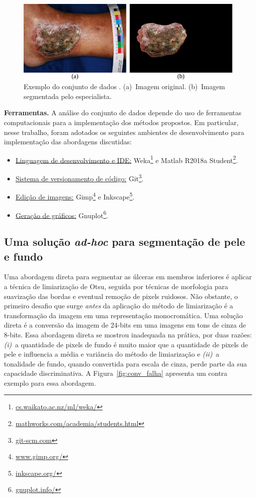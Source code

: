 \begin{figure}[!htb]
\centering
\includegraphics[scale=1]{_fig/im_sampling_vs_im_label.pdf}
\caption[Exemplo do conjunto de dados \dataset.]{Exemplo do conjunto de dados \dataset.
(a)~Imagem original.
(b)~Imagem segmentada pelo especialista.}
\label{fig:dataset_esp}
\end{figure}

\noindent
\textbf{Ferramentas.}
A análise do conjunto de dados depende do uso de ferramentas computacionais para a implementação dos métodos propostos.
Em particular, nesse trabalho, foram adotados os seguintes ambientes de desenvolvimento para implementação das abordagens discutidas:

\begin{itemize}
    \item \underline{Linguagem de desenvolvimento e IDE:} Weka\footnote{\url{cs.waikato.ac.nz/ml/weka/}} e Matlab R2018a Student\footnote{\url{mathworks.com/academia/students.html}}.
    \item \underline{Sistema de versionamento de código:} Git\footnote{\url{git-scm.com}}.
    \item \underline{Edição de imagens:} Gimp\footnote{\url{www.gimp.org/}} e Inkscape\footnote{\url{inkscape.org/}}.
    \item \underline{Geração de gráficos:} Gnuplot\footnote{\url{gnuplot.info/}}.
\end{itemize}

\subsection{Uma solução \textit{ad-hoc} para segmentação de pele e fundo}

Uma abordagem direta para segmentar as úlceras em membros inferiores é aplicar a técnica de limiarização de Otsu, seguida por técnicas de morfologia para suavização das bordas e eventual remoção de pixels ruidosos.
Não obstante, o primeiro desafio que surge \textit{antes} da aplicação do método de limiarização é a transformação da imagem em uma representação monocromática.
Uma solução direta é a conversão da imagem de 24-bits em uma imagens em tons de cinza de 8-bits.
Essa abordagem direta se mostrou inadequada na prática, por duas razões:
\textit{(i)}~a quantidade de pixels de fundo é muito maior que a quantidade de pixels de pele e influencia a média e variância do método de limiarização e
\textit{(ii)}~a tonalidade de fundo, quando convertida para escala de cinza, perde parte da sua capacidade discriminativa.
A Figura~\ref{fig:conv_falha} apresenta um contra exemplo para essa abordagem.

